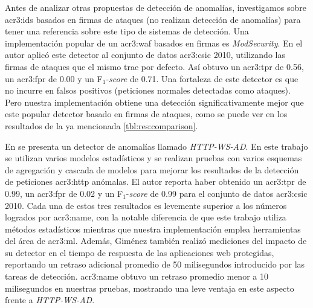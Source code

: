 Antes de analizar otras propuestas de detección de anomalías, investigamos
sobre \gls{acr3:ids} basados en firmas de ataques (no realizan detección
de anomalías) para tener una referencia sobre este tipo de sistemas de
detección. Una implementación popular de un \gls{acr3:waf} basados en
firmas es \textit{ModSecurity}.
En \citep{gimenez2015tfg} %
el autor aplicó este detector al conjunto de datos \gls{acr3:csic} 2010,
utilizando las firmas de ataques que el mismo trae por defecto. Así obtuvo
un \gls{acr3:tpr} de \num{0.56}, un \gls{acr3:fpr} de \num{0.00} y un
F$_{1}$-\textit{score} de \num{0.71}. Una fortaleza de este detector es que
no incurre en falsos positivos (peticiones normales detectadas como ataques).
Pero nuestra implementación obtiene una detección significativamente mejor
que este popular detector basado en firmas de ataques, como se puede ver
en los resultados de la ya mencionada \autoref{tbl:res:comparison}.

En \citep{gimenez2015tfg} %
se presenta un detector de anomalías llamado \textit{HTTP-WS-AD}.
En este trabajo se utilizan varios modelos estadísticos y se realizan
pruebas con varios esquemas de agregación y cascada de modelos para
mejorar los resultados de la detección de peticiones \gls{acr3:http}
anómalas. El autor reporta haber obtenido un \gls{acr3:tpr} de \num{0.99},
un \gls{acr3:fpr} de \num{0.02} y un F$_{1}$-\textit{score} de \num{0.99}
para el conjunto de datos \gls{acr3:csic} 2010.
Cada una de estos tres resultados es levemente superior a los números
logrados por \gls{acr3:name}, con la notable diferencia de que este
trabajo utiliza métodos estadísticos mientras que nuestra implementación
emplea herramientas del área de \gls{acr3:ml}.
Además, Giménez también realizó mediciones del impacto de su detector
en el tiempo de respuesta de las aplicaciones web protegidas, reportando
un retraso adicional promedio de 50 milisegundos introducido por las tareas
de detección. %
\gls{acr3:name} obtuvo un retraso promedio menor a 10 milisegundos en
nuestras pruebas, mostrando una leve ventaja en este aspecto frente a
\textit{HTTP-WS-AD}.

